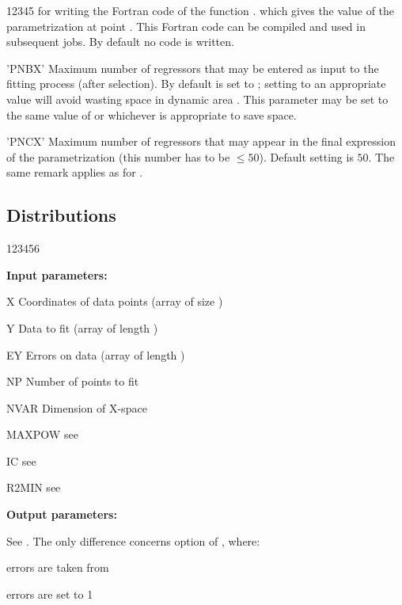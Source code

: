 \begin{DLtt}{12345}
for writing the Fortran code of the function .
which gives the value of the parametrization at point .
This Fortran code can be compiled and used in subsequent jobs.
By default no code is written.
\item['PNBX'] Maximum number of regressors that may be entered as input to the
fitting process (after selection).
By default  is set to ;
setting  to an appropriate value will avoid wasting space in
dynamic area .
This parameter may be set to the same value of
 or  whichever is appropriate to save space.
\item['PNCX'] Maximum number of regressors that may appear
in the final
expression of the parametrization (this number has to be $\leq 50$).
Default setting is $50$. The same remark applies as for .
\end{DLtt}
 
\subsection*{Distributions}
 
 
\begin{DLtt}{123456}
\item[{\rm\bf Input parameters:}]
\item[X] Coordinates of data points (array of size )
\item[Y] Data to fit (array of length )
\item[EY] Errors on data (array of length )
\item[NP] Number of points to fit
\item[NVAR] Dimension of X-space
\item[MAXPOW] see 
\item[IC] see 
\item[R2MIN] see 
\item[{\rm\bf Output parameters:}]
\item[ ] See .
     The only difference concerns option  of , where:
     \begin{UL}
         \item {} errors are taken from 
         \item {} errors are set to 1
     \end{UL}
\end{DLtt}

